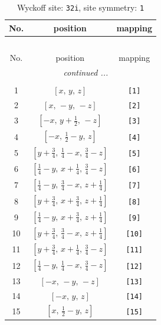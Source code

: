 \documentclass[fleqn,8pt]{jsarticle}
\begin{document}
\renewcommand{\arraystretch}{1.2}
\begin{longtable}{ccc}
\caption{Wyckoff site: {\tt 32i}, site symmetry: {\tt 1}}
 \\
 \hline \hline
No. & position & mapping \\ \hline \endfirsthead

\multicolumn{2}{l}{\tablename\ \thetable{}} \\
 \hline \hline
No. & position & mapping \\ \hline \endhead

 \hline \hline
\multicolumn{2}{r}{\footnotesize\it continued ...} \\ \endfoot

 \hline \hline
\multicolumn{2}{r}{} \\ \endlastfoot

1 & $\left[ x,\, y,\, z \right]$ & {\tt [1]} \\ \hline
2 & $\left[ x,\, - y,\, - z \right]$ & {\tt [2]} \\ \hline
3 & $\left[ - x,\, y + \frac{1}{2},\, - z \right]$ & {\tt [3]} \\ \hline
4 & $\left[ - x,\, \frac{1}{2} - y,\, z \right]$ & {\tt [4]} \\ \hline
5 & $\left[ y + \frac{3}{4},\, \frac{1}{4} - x,\, \frac{3}{4} - z \right]$ & {\tt [5]} \\ \hline
6 & $\left[ \frac{1}{4} - y,\, x + \frac{1}{4},\, \frac{3}{4} - z \right]$ & {\tt [6]} \\ \hline
7 & $\left[ \frac{1}{4} - y,\, \frac{3}{4} - x,\, z + \frac{1}{4} \right]$ & {\tt [7]} \\ \hline
8 & $\left[ y + \frac{3}{4},\, x + \frac{3}{4},\, z + \frac{1}{4} \right]$ & {\tt [8]} \\ \hline
9 & $\left[ \frac{1}{4} - y,\, x + \frac{3}{4},\, z + \frac{1}{4} \right]$ & {\tt [9]} \\ \hline
10 & $\left[ y + \frac{3}{4},\, \frac{3}{4} - x,\, z + \frac{1}{4} \right]$ & {\tt [10]} \\ \hline
11 & $\left[ y + \frac{3}{4},\, x + \frac{1}{4},\, \frac{3}{4} - z \right]$ & {\tt [11]} \\ \hline
12 & $\left[ \frac{1}{4} - y,\, \frac{1}{4} - x,\, \frac{3}{4} - z \right]$ & {\tt [12]} \\ \hline
13 & $\left[ - x,\, - y,\, - z \right]$ & {\tt [13]} \\ \hline
14 & $\left[ - x,\, y,\, z \right]$ & {\tt [14]} \\ \hline
15 & $\left[ x,\, \frac{1}{2} - y,\, z \right]$ & {\tt [15]} \\ \hline

\end{longtable}
\end{document}

